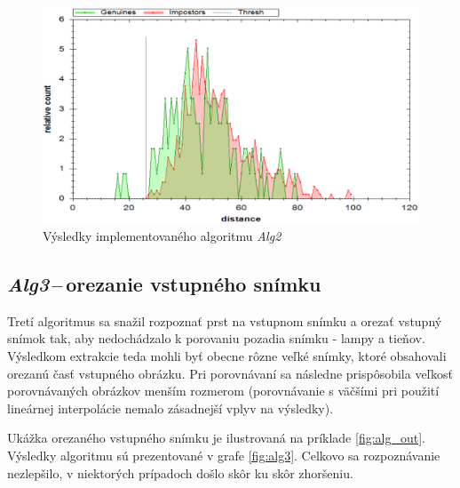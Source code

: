 \documentclass[11pt,a4paper]{article}
\begin{document}
\vfill
\begin{figure}[ht!]
	\centering
	\includegraphics[width=17cm]{fig/alg2.eps}
	\caption{\label{fig:alg2} Výsledky implementovaného algoritmu \emph{Alg2}}
\end{figure}
\vfill
\vfill

\clearpage
\subsection{\emph{Alg3}\,--\,orezanie vstupného snímku} \label{alg3}

Tretí algoritmus sa snažil rozpoznať prst na vstupnom snímku a orezať vstupný
snímok tak, aby nedochádzalo k porovaniu pozadia snímku - lampy a tieňov.
Výsledkom extrakcie teda mohli byť obecne rôzne veľké snímky, ktoré obsahovali
orezanú časť vstupného obrázku. Pri porovnávaní sa následne prispôsobila veľkosť
porovnávaných obrázkov menším rozmerom (porovnávanie s väčšími pri použití
lineárnej interpolácie nemalo zásadnejší vplyv na výsledky).

Ukážka orezaného vstupného snímku je ilustrovaná na príklade \ref{fig:alg_out}.
Výsledky algoritmu sú prezentované v grafe \ref{fig:alg3}. Celkovo sa
rozpoznávanie nezlepšilo, v niektorých prípadoch došlo skôr ku skôr zhoršeniu.
\end{document}
